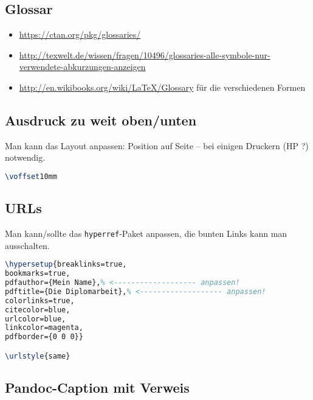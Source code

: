 \hypertarget{glossar}{%
\subsection{Glossar}\label{glossar}}

\begin{itemize}
\tightlist
\item
  \url{https://ctan.org/pkg/glossaries/}
\item
  \url{http://texwelt.de/wissen/fragen/10496/glossaries-alle-symbole-nur-verwendete-abkurzungen-anzeigen}
\item
  \url{http://en.wikibooks.org/wiki/LaTeX/Glossary} für die
  verschiedenen Formen
\end{itemize}

\hypertarget{ausdruck-zu-weit-obenunten}{%
\subsection{Ausdruck zu weit
oben/unten}\label{ausdruck-zu-weit-obenunten}}

Man kann das Layout anpassen: Position auf Seite -- bei einigen Druckern
(HP ?) notwendig.

\begin{lstlisting}[language=TeX]
\voffset10mm
\end{lstlisting}

\hypertarget{urls}{%
\subsection{URLs}\label{urls}}

Man kann/sollte das \passthrough{\lstinline!hyperref!}-Paket anpassen,
die bunten Links kann man ausschalten.

\begin{lstlisting}[language=TeX]
\hypersetup{breaklinks=true,
bookmarks=true,
pdfauthor={Mein Name},% <------------------- anpassen!
pdftitle={Die Diplomarbeit},% <------------------- anpassen!
colorlinks=true,
citecolor=blue,
urlcolor=blue,
linkcolor=magenta,
pdfborder={0 0 0}}

\urlstyle{same}
\end{lstlisting}

\hypertarget{pandoc-caption-mit-verweis}{%
\subsection{Pandoc-Caption mit
Verweis}\label{pandoc-caption-mit-verweis}}

